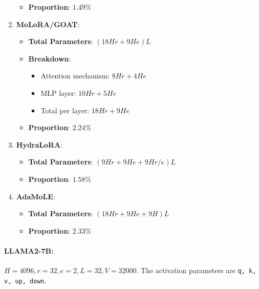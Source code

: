 \begin{enumerate}
\begin{itemize}
        \item \textbf{Proportion}: \( 1.49\% \)
    \end{itemize}
    \item \textbf{MoLoRA/GOAT}:
    \begin{itemize}
        \item \textbf{Total Parameters}: \( (18Hr + 9He)L \)
        \item \textbf{Breakdown}:
        \begin{itemize}
            \item Attention mechanism: \( 8Hr+4He \)
            \item MLP layer: \( 10Hr+5He \)
            \item Total per layer: \( 18Hr + 9He \)
        \end{itemize}
        \item \textbf{Proportion}: \( 2.24\% \)
    \end{itemize}
    \item \textbf{HydraLoRA}:
    \begin{itemize}
        \item \textbf{Total Parameters}: \( (9Hr + 9He + 9Hr/e)L \)
        \item \textbf{Proportion}: \( 1.58\% \)
    \end{itemize}
    \item \textbf{AdaMoLE}:
    \begin{itemize}
        \item \textbf{Total Parameters}: \( (18Hr + 9He + 9H)L \)
        \item \textbf{Proportion}: \( 2.33\% \)
    \end{itemize}
\end{enumerate}

\paragraph{LLAMA2-7B:} $H=4096, r=32, e=2, L=32, V=32000$. The activation parameters are \texttt{q, k, v, up, down}.

